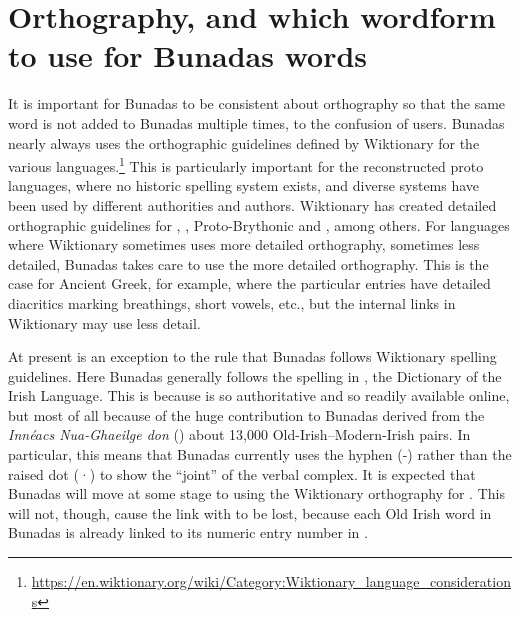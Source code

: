 \documentclass[output=paper,colorlinks,citecolor=brown]{langscibook}
\begin{document}
\section{Orthography, and which wordform to use for Bunadas words} 

It is important for Bunadas to be consistent about orthography so that the same word is not added to Bunadas multiple times, to the confusion of users. Bunadas nearly always uses the orthographic guidelines defined by Wiktionary for the various languages.\footnote{ \url{https://en.wiktionary.org/wiki/Category:Wiktionary_language_considerations} } This is particularly important for the reconstructed proto languages, where no historic spelling system exists, and diverse systems have been used by different authorities and authors. Wiktionary has created detailed orthographic guidelines for , , Proto-Brythonic and , among others. For languages where Wiktionary sometimes uses more detailed orthography, sometimes less detailed, Bunadas takes care to use the more detailed orthography. This is the case for Ancient Greek, for example, where the particular entries have detailed diacritics marking breathings, short vowels, etc., but the internal links in Wiktionary may use less detail.

At present  is an exception to the rule that Bunadas follows Wiktionary spelling guidelines. Here Bunadas generally follows the spelling in , the Dictionary of the Irish Language. This is because  is so authoritative and so readily available online, but most of all because of the huge contribution to Bunadas derived from the \textit{Innéacs Nua-Ghaeilge don } (\cite{cod:DeBaldraithe1981}) about 13,000 Old-Irish–Modern-Irish pairs. In particular, this means that Bunadas currently uses the hyphen (-) rather than the raised dot (·) to show the “joint” of the verbal complex. It is expected that Bunadas will move at some stage to using the Wiktionary orthography for . This will not, though, cause the link with  to be lost, because each Old Irish word in Bunadas is already linked to its numeric entry number in .
\end{document}
